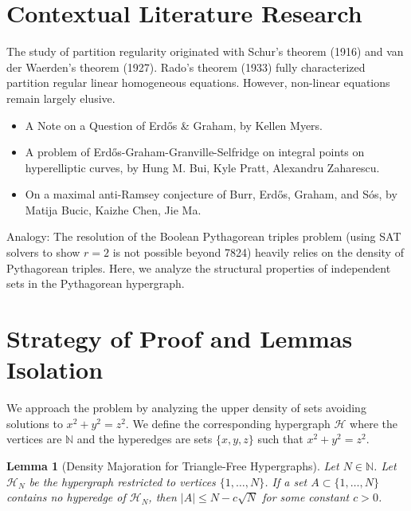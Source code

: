 \documentclass[12pt]{article}
\newtheorem{lemma}[theorem]{Lemma}
\begin{document}
\section{Contextual Literature Research}
The study of partition regularity originated with Schur's theorem (1916) and van der Waerden's theorem (1927). Rado's theorem (1933) fully characterized partition regular linear homogeneous equations. However, non-linear equations remain largely elusive.
\begin{itemize}
\item A Note on a Question of Erd\H{o}s \& Graham, by Kellen Myers.
\item A problem of Erdős-Graham-Granville-Selfridge on integral points on hyperelliptic curves, by Hung M. Bui, Kyle Pratt, Alexandru Zaharescu.
\item On a maximal anti-Ramsey conjecture of Burr, Erdős, Graham, and Sós, by Matija Bucic, Kaizhe Chen, Jie Ma.
\end{itemize}
Analogy: The resolution of the Boolean Pythagorean triples problem (using SAT solvers to show $r=2$ is not possible beyond 7824) heavily relies on the density of Pythagorean triples. Here, we analyze the structural properties of independent sets in the Pythagorean hypergraph.

\section{Strategy of Proof and Lemmas Isolation}
We approach the problem by analyzing the upper density of sets avoiding solutions to $x^2+y^2=z^2$. We define the corresponding hypergraph $\mathcal{H}$ where the vertices are $\ensuremath{\mathbb{N}}$ and the hyperedges are sets $\{x, y, z\}$ such that $x^2+y^2=z^2$.

\begin{lemma}[Density Majoration for Triangle-Free Hypergraphs]
\label{lem:density}
Let $N \in \ensuremath{\mathbb{N}}$. Let $\mathcal{H}_N$ be the hypergraph restricted to vertices $\{1, \dots, N\}$. If a set $A \subset \{1, \dots, N\}$ contains no hyperedge of $\mathcal{H}_N$, then $|A| \leq N - c \sqrt{N}$ for some constant $c > 0$.
\end{lemma}
\end{document}
